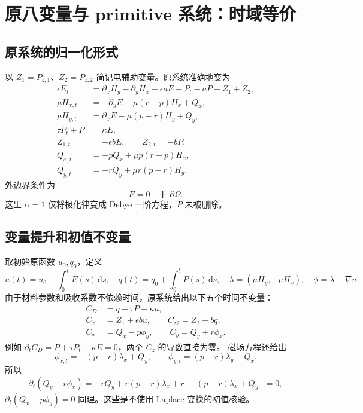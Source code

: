 \documentclass[UTF8,a4paper,11pt,fontset=none]{ctexart}
\numberwithin{equation}{section}
\theoremstyle{definition}
\theoremstyle{definition}
\newcommand{\Om}{\Omega}
\newcommand{\eps}{\epsilon}
\newcommand{\dd}{\,\mathrm d}
\begin{document}
\section{原八变量与 primitive 系统：时域等价}
\label{sec:mapping}

\subsection{原系统的归一化形式}
以 $Z_1=P_{z,1}$、$Z_2=P_{z,2}$ 简记电辅助变量。原系统准确地变为
\begin{equation}\label{eq:eight}
\begin{aligned}
 \eps E_t&=\partial_xH_y-\partial_yH_x-\eps aE-P_t-aP+Z_1+Z_2,\\
 \mu H_{x,t}&=-\partial_yE-\mu(r-p)H_x+Q_x,\\
 \mu H_{y,t}&=\partial_xE-\mu(p-r)H_y+Q_y,\\
 \tau P_t+P&=\kappa E,\\
 Z_{1,t}&=-\eps bE,\qquad Z_{2,t}=-bP,\\
 Q_{x,t}&=-pQ_x+\mu p(r-p)H_x,\\
 Q_{y,t}&=-rQ_y+\mu r(p-r)H_y.
\end{aligned}
\end{equation}
外边界条件为
\begin{equation}\label{eq:pec}
 E=0\quad\text{于 }\partial\Om.
\end{equation}
这里 $\alpha=1$ 仅将极化律变成 Debye 一阶方程，$P$ 未被删除。

\subsection{变量提升和初值不变量}
取初始原函数 $u_0,q_0$，定义
\begin{equation}\label{eq:lift}
 u(t)=u_0+\int_0^tE(s)\dd s,\quad
 q(t)=q_0+\int_0^tP(s)\dd s,\quad
 \lambda=(\mu H_y,-\mu H_x),\quad \phi=\lambda-\nabla u.
\end{equation}
由于材料参数和吸收系数不依赖时间，原系统给出以下五个时间不变量：
\begin{equation}\label{eq:invariants}
\begin{aligned}
 C_D&=q+\tau P-\kappa u,\\
 C_{z1}&=Z_1+\eps bu,\qquad C_{z2}=Z_2+bq,\\
 C_x&=Q_x-p\phi_y,\qquad C_y=Q_y+r\phi_x.
\end{aligned}
\end{equation}
例如 $\partial_t C_D=P+\tau P_t-\kappa E=0$，两个 $C_z$ 的导数直接为零。
磁场方程还给出
\[
 \phi_{x,t}=-(p-r)\lambda_x+Q_y,\qquad
 \phi_{y,t}=(p-r)\lambda_y-Q_x.
\]
所以
\[
 \partial_t(Q_y+r\phi_x)
 =-rQ_y+r(p-r)\lambda_x+r[-(p-r)\lambda_x+Q_y]=0,
\]
$\partial_t(Q_x-p\phi_y)=0$ 同理。这些是不使用 Laplace 变换的初值核验。
\end{document}
